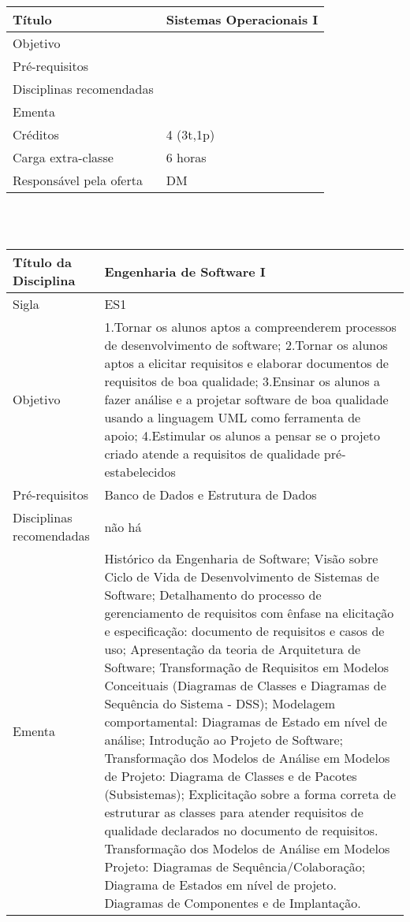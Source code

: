 \begin{tabular}{|p{4.5cm}|p{10.0cm}|} \hline
Título & Sistemas Operacionais I \\ \hline
Objetivo &  \\ \hline
Pré-requisitos &  \\ \hline
Disciplinas recomendadas &  \\ \hline
Ementa &  \\ \hline
Créditos & 4 (3t,1p) \\ \hline
Carga extra-classe & 6 horas \\ \hline
Responsável pela oferta & DM \\ \hline
\end{tabular}
\\
\\


\begin{center}
\begin{tabular}{|p{4.5cm}|p{10.0cm}|} \hline
Título da Disciplina & Engenharia de Software I \\

\hline Sigla & ES1

\\

\hline
Objetivo &

1.Tornar os alunos aptos a compreenderem processos de desenvolvimento de software;
2.Tornar os alunos aptos a elicitar requisitos e elaborar documentos de requisitos de boa qualidade;
3.Ensinar os alunos a fazer análise e a projetar software de boa qualidade usando a linguagem UML como ferramenta de apoio; 
4.Estimular os alunos a pensar se o projeto criado atende a requisitos de qualidade pré-estabelecidos

\\ \hline
Pré-requisitos & Banco de Dados e Estrutura de Dados

\\ \hline
Disciplinas recomendadas & não há \\ 

\hline
Ementa & Histórico da Engenharia de Software; Visão sobre Ciclo de Vida de Desenvolvimento de Sistemas de Software; Detalhamento do processo de gerenciamento de requisitos com ênfase na elicitação e especificação: documento de requisitos e casos de uso; Apresentação da teoria de Arquitetura de Software; Transformação de Requisitos em Modelos Conceituais (Diagramas de Classes e Diagramas de Sequência do Sistema - DSS); Modelagem comportamental: Diagramas de Estado em nível de análise; Introdução ao Projeto de Software; Transformação dos Modelos de Análise em Modelos de Projeto: Diagrama de Classes e de Pacotes (Subsistemas); Explicitação sobre a forma correta de estruturar as classes para atender requisitos de qualidade declarados no documento de requisitos. Transformação dos Modelos de Análise em Modelos Projeto: Diagramas de Sequência/Colaboração; Diagrama de Estados em nível de projeto. Diagramas de Componentes e de Implantação.




\end{tabular}
\end{center}
